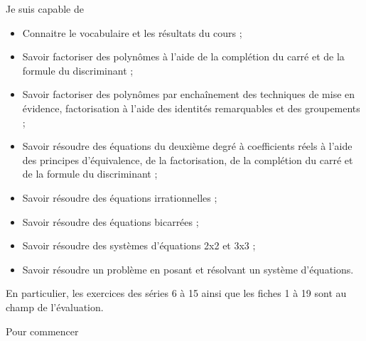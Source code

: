 \documentclass[a4paper,12pt]{report}
\begin{document}
Je suis capable de

\begin{itemize}
\item     Connaitre le vocabulaire et les résultats du cours ;
\item  Savoir factoriser des polynômes à l'aide de la complétion du carré et de la formule du discriminant ;
\item  Savoir factoriser des polynômes par enchaînement des techniques de mise en évidence, factorisation à l'aide des identités remarquables et des groupements ;
\item  Savoir résoudre des équations du deuxième degré à coefficients réels à l'aide des principes d'équivalence, de la factorisation, de la complétion du carré et de la formule du discriminant ;
\item   Savoir résoudre des équations irrationnelles ;
\item   Savoir résoudre des équations bicarrées ;
\item   Savoir résoudre des systèmes d'équations 2x2 et 3x3 ;
\item    Savoir résoudre un problème en posant et résolvant un système d'équations.
\end{itemize}

En particulier, les exercices des séries 6 à 15 ainsi que les fiches 1 à 19 sont au champ de l'évaluation.

Pour commencer
\end{document}
